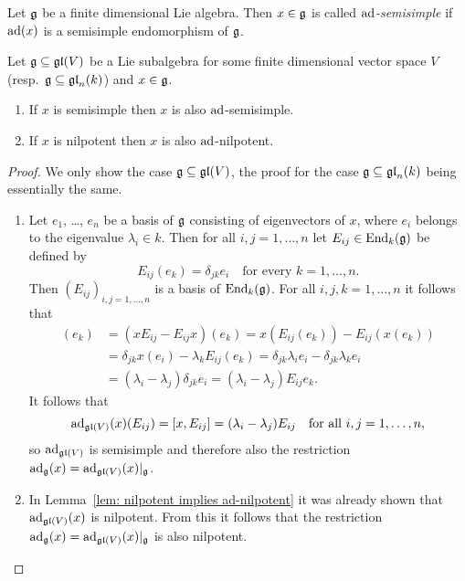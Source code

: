 \begin{defi}
 Let $\mathfrak{g}$ be a finite dimensional Lie algebra. Then $x \in \mathfrak{g}$ is called \emph{$\operatorname{ad}$-semisimple} if $\operatorname{ad}(x)$ is a semisimple endomorphism of $\mathfrak{g}$.
\end{defi}


\begin{lem}\label{lem: ss and nilpotent implies ad-ss and ad-nilpotent}
 Let $\mathfrak{g} \subseteq \mathfrak{gl}(V)$ be a Lie subalgebra for some finite dimensional vector space $V$ (resp.\ $\mathfrak{g} \subseteq \mathfrak{gl}_n(k)$) and $x \in \mathfrak{g}$.
 \begin{enumerate}
  \item
   If $x$ is semisimple then $x$ is also $\operatorname{ad}$-semisimple.
  \item
   If $x$ is nilpotent then $x$ is also $\operatorname{ad}$-nilpotent.
 \end{enumerate}
\end{lem}
\begin{proof}
 We only show the case $\mathfrak{g} \subseteq \mathfrak{gl}(V)$, the proof for the case $\mathfrak{g} \subseteq \mathfrak{gl}_n(k)$ being essentially the same.
 \begin{enumerate}[leftmargin=*]
  \item
   Let $e_1$, \dots, $e_n$ be a basis of $\mathfrak{g}$ consisting of eigenvectors of $x$, where $e_i$ belongs to the eigenvalue $\lambda_i \in k$. Then for all \mbox{$i,j = 1, \dotsc, n$} let $E_{ij} \in \operatorname{End}_k(\mathfrak{g})$ be defined by
   \[
    E_{ij}(e_k) = \delta_{jk} e_i \quad \text{for every $k = 1, \dotsc, n$}.
   \]
   Then $(E_{ij})_{i,j=1,\dotsc,n}$ is a basis of $\operatorname{End}_k(\mathfrak{g})$. For all $i,j,k = 1, \dotsc, n$ it follows that
   \begin{align*}
    [x,E_{ij}](e_k)
    &= (x E_{ij} - E_{ij} x)(e_k)
    = x(E_{ij}(e_k)) - E_{ij}(x(e_k)) \\
    &= \delta_{jk} x(e_i) - \lambda_k E_{ij}(e_k)
    = \delta_{jk} \lambda_i e_i - \delta_{jk} \lambda_k e_i \\
    &= (\lambda_i - \lambda_j) \delta_{jk} e_i
    = (\lambda_i - \lambda_j) E_{ij} e_k.
   \end{align*}
   It follows that
   \[
    \operatorname{ad}_{\mathfrak{gl}(V)}(x)(E_{ij}) = [x,E_{ij}] = (\lambda_i - \lambda_j) E_{ij}
    \quad \text{for all $i,j = 1, \dotsc, n$},
   \]
   so $\operatorname{ad}_{\mathfrak{gl}(V)}$ is semisimple and therefore also the restriction $\operatorname{ad}_{\mathfrak{g}}(x) = \operatorname{ad}_{\mathfrak{gl}(V)}(x)|_{\mathfrak{g}}$.
   
  \item
   In Lemma~\ref{lem: nilpotent implies ad-nilpotent} it was already shown that $\operatorname{ad}_{\mathfrak{gl}(V)}(x)$ is nilpotent. From this it follows that the restriction $\operatorname{ad}_{\mathfrak{g}}(x) = \operatorname{ad}_{\mathfrak{gl}(V)}(x)|_{\mathfrak{g}}$ is also nilpotent.
  \qedhere
 \end{enumerate}
\end{proof}


